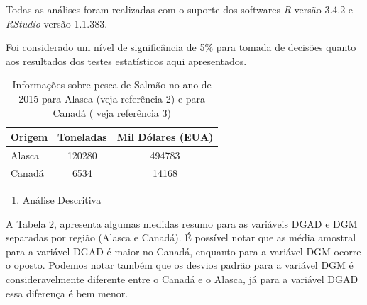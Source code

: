 \documentclass[10pt,portuguese,]{article}
\providecommand{\tightlist}{%
  \setlength{\itemsep}{0pt}\setlength{\parskip}{0pt}}
\begin{document}
Todas as análises foram realizadas com o suporte dos softwares \emph{R}
versão 3.4.2 e \emph{RStudio} versão 1.1.383.

Foi considerado um nível de significância de 5\% para tomada de decisões
quanto aos resultados dos testes estatísticos aqui apresentados.

\vspace{0.5cm}

\begin{table}[!h]
\centering
\caption{Informações sobre pesca de Salmão no ano de 2015 para Alasca (veja referência 2) e para Canadá ( veja referência 3)}
\bgroup
\def\arraystretch{1.0}
\begin{tabular}{lcc}
\toprule
\multicolumn{1}{l}{Origem} & \multicolumn{1}{l}{Toneladas} & \multicolumn{1}{l}{Mil Dólares (EUA)} \\ \midrule
\hline
Alasca                     & 120280                        & 494783                                \\
Canadá                     & 6534                          & 14168          \\ \bottomrule
   \hline
\end{tabular}
\egroup
\end{table}

\newpage

\begin{enumerate}
\def\labelenumi{\arabic{enumi}.}
\setcounter{enumi}{1}
\tightlist
\item
  Análise Descritiva
\end{enumerate}

\vspace{0.5cm}

A Tabela 2, apresenta algumas medidas resumo para as variáveis DGAD e
DGM separadas por região (Alasca e Canadá). É possível notar que as
média amostral para a variável DGAD é maior no Canadá, enquanto para a
variável DGM ocorre o oposto. Podemos notar também que os desvios padrão
para a variável DGM é consideravelmente diferente entre o Canadá e o
Alasca, já para a variável DGAD essa diferença é bem menor.

\vspace{0.5cm}

\vspace{0.5cm}
\end{document}
